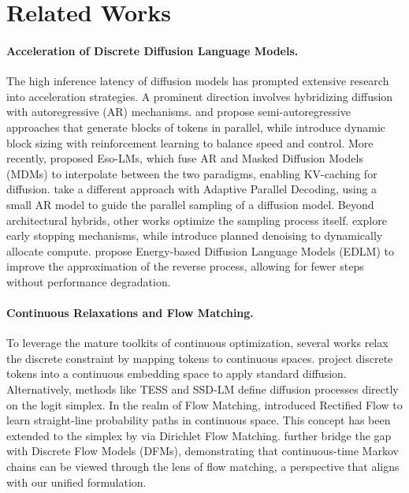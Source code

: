 \section{Related Works}
\label{sec:related works}

\paragraph{Acceleration of Discrete Diffusion Language Models.}
The high inference latency of diffusion models has prompted extensive research into acceleration strategies.
A prominent direction involves hybridizing diffusion with autoregressive (AR) mechanisms. \citet{ardiffusion}
and \citet{han2023ssd} propose semi-autoregressive approaches that generate blocks of tokens in parallel,
while \citet{huang_ctrldiff_2025} introduce dynamic block sizing with reinforcement learning to balance speed
and control. More recently, \citet{sahoo_esoteric_2025} proposed Eso-LMs, which fuse AR and Masked Diffusion
Models (MDMs) to interpolate between the two paradigms, enabling KV-caching for diffusion.
\citet{israel_accelerating_2025} take a different approach with Adaptive Parallel Decoding, using a small
AR model to guide the parallel sampling of a diffusion model.
Beyond architectural hybrids, other works optimize the sampling process itself.
\citet{lyu2022accelerating} explore early stopping mechanisms, while \citet{liu2024think}
introduce planned denoising to dynamically allocate compute. \citet{xu_energy-based_2025}
propose Energy-based Diffusion Language Models (EDLM) to improve the approximation of the reverse process,
allowing for fewer steps without performance degradation.

\paragraph{Continuous Relaxations and Flow Matching.}
To leverage the mature toolkits of continuous optimization, several works relax the discrete constraint by mapping
tokens to continuous spaces. \citet{gong2023diffuseq} project discrete tokens into a continuous embedding space
to apply standard diffusion. Alternatively, methods like TESS \citep{mahabadi_tess_2023} and SSD-LM
\citep{han2023ssd} define diffusion processes directly on the logit simplex.
In the realm of Flow Matching, \citet{liu2022flow} introduced Rectified Flow to learn straight-line probability
paths in continuous space. This concept has been extended to the simplex by \citet{stark2024dirichlet}
via Dirichlet Flow Matching. \citet{campbell_generative_2024} further bridge the gap with Discrete Flow Models (DFMs),
demonstrating that continuous-time Markov chains can be viewed through the lens of flow matching, a perspective that
aligns with our unified formulation.

